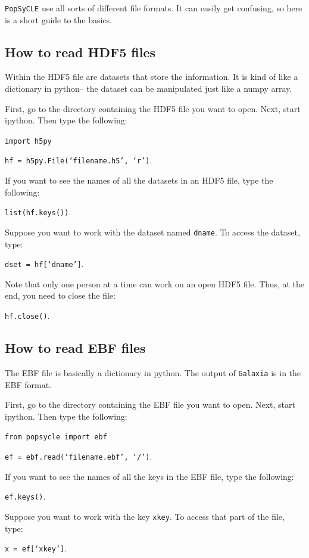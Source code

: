 \documentclass{scrartcl}
\begin{document}
\texttt{PopSyCLE} use all sorts of different file formats. 
It can easily get confusing, so here is a short guide to the basics.

\subsection{How to read HDF5 files}

Within the HDF5 file are datasets that store the information. It is kind of like a dictionary in python-- the dataset can be manipulated just like a numpy array.

First, go to the directory containing the HDF5 file you want to open. Next, start ipython. Then type the following:

\texttt{import h5py}

\texttt{hf = h5py.File(`filename.h5', `r')}.

If you want to see the names of all the datasets in an HDF5 file, type the following:

\texttt{list(hf.keys())}.

Suppose you want to work with the dataset named \texttt{dname}. 
To access the dataset, type:

\texttt{dset = hf[`dname']}.

Note that only one person at a time can work on an open HDF5 file. Thus, at the end, you need to close the file:

\texttt{hf.close()}.

\subsection{How to read EBF files}

The EBF file is basically a dictionary in python. 
The output of \texttt{Galaxia} is in the EBF format. 

First, go to the directory containing the EBF file you want to open. 
Next, start ipython. 
Then type the following:

\texttt{from popsycle import ebf}

\texttt{ef = ebf.read(`filename.ebf', `/')}.

If you want to see the names of all the keys in the EBF file, type the following:

\texttt{ef.keys()}.

Suppose you want to work with the key \texttt{xkey}. To access that part of the file, type:

\texttt{x = ef[`xkey']}.
\end{document}
